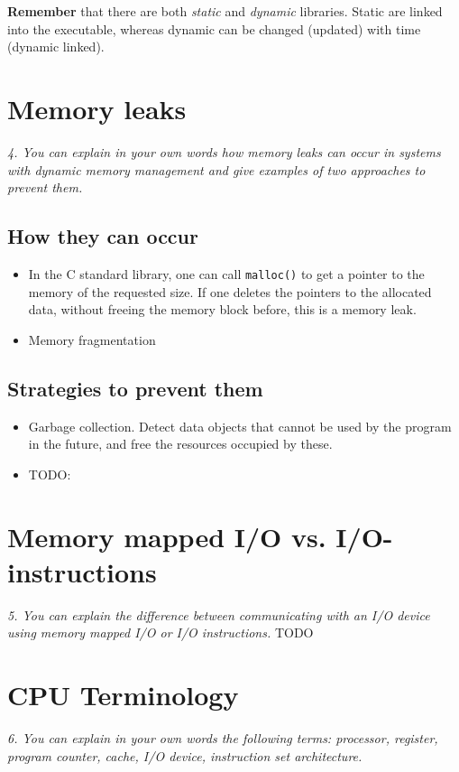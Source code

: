 \documentclass{article}
\begin{document}
\textbf{Remember} that there are both \emph{static} and \emph{dynamic} libraries. Static are linked into the executable, whereas dynamic can be changed (updated) with time (dynamic linked).


\section{Memory leaks}
\emph{4. You can explain in your own words how memory leaks can occur in systems with dynamic memory management and give examples of two approaches to prevent them.}

\subsection{How they can occur}
\begin{itemize}
	\item In the C standard library, one can call \texttt{malloc()} to get a pointer to the memory of the requested size.
 If one deletes the pointers to the allocated data, without freeing the memory block before, this is a memory leak.

 	\item Memory fragmentation
\end{itemize}


\subsection{Strategies to prevent them}
\begin{itemize}
	\item Garbage collection. Detect data objects that cannot be used by the program in the future, and free the resources occupied by these.
	\item TODO:
\end{itemize}


\section{Memory mapped I/O vs. I/O-instructions}
\emph{5. You can explain the difference between communicating with an I/O device using memory mapped I/O or I/O instructions.}
TODO


\section{CPU Terminology}
\emph{6. You can explain in your own words the following terms: processor, register, program counter, cache, I/O device, instruction set architecture.}
\end{document}

